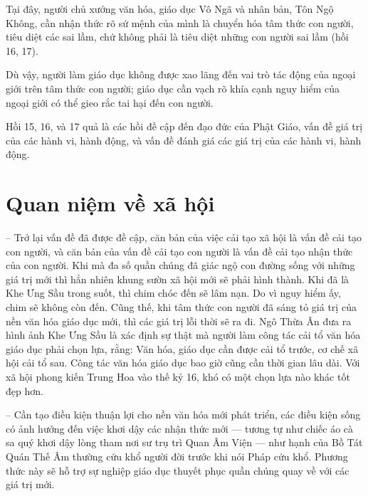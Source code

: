 Tại đây, người chủ xướng văn hóa, giáo dục Vô Ngã và nhân bản, Tôn Ngộ Không, cần nhận thức rõ sứ mệnh của mình là chuyển hóa tâm thức con người, tiêu diệt các sai lầm, chứ không phải là tiêu diệt những con người sai lầm (hồi 16, 17).

Dù vậy, người làm giáo dục không được xao lãng đến vai trò tác động của ngoại giới trên tâm thức con người; giáo dục cần vạch rõ khía cạnh nguy hiểm của ngoại giới có thể gieo rắc tai hại đến con người.

Hồi 15, 16, và 17 quả là các hồi đề cập đến đạo đức của Phật Giáo, vấn đề giá trị của các hành vi, hành động, và vấn đề đánh giá các giá trị của các hành vi, hành động.

\section{Quan niệm về xã hội} %
\label{sec:15_xa_hoi}

-- Trở lại vấn đề đã được đề cập, căn bản của việc cải tạo xã hội là vấn đề cải tạo con người, và căn bản của vấn đề cải tạo con người là vấn đề cải tạo nhận thức của con người. Khi mà đa số quần chúng đã giác ngộ con đường sống với những giá trị mới thì hẳn nhiên khung sườn xã hội mới sẽ phải hình thành. Khi đã là Khe Ưng Sầu trong suốt, thì chim chóc đến sẽ lâm nạn. Do vì nguy hiểm ấy, chim sẽ không còn đến. Cũng thế, khi tâm thức con người đã sáng tỏ giá trị của nền văn hóa giáo dục mới, thì các giá trị lỗi thời sẽ ra đi. Ngô Thừa Ân đưa ra hình ảnh Khe Ưng Sầu là xác định sự thật mà người làm công tác cải tổ văn hóa giáo dục phải chọn lựa, rằng: Văn hóa, giáo dục cần được cải tổ trước, cơ chế xã hội cải tổ sau. Công tác văn hóa giáo dục bao giờ cũng cần thời gian lâu dài. Với xã hội phong kiến Trung Hoa vào thế kỷ 16, khó có một chọn lựa nào khác tốt đẹp hơn.

-- Cần tạo điều kiện thuận lợi cho nền văn hóa mới phát triển, các điều kiện sống có ảnh hưởng đến việc khơi dậy các nhận thức mới --- tương tự như chiếc áo cà sa quý khơi dậy lòng tham nơi sư trụ trì Quan Âm Viện --- như hạnh của Bồ Tát Quán Thế Âm thường cứu khổ người đời trước khi nói Pháp cứu khổ. Phương thức này sẽ hỗ trợ sự nghiệp giáo dục thuyết phục quần chúng quay về với các giá trị mới.
